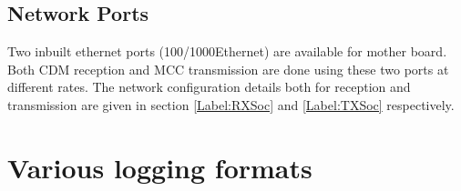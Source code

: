 \subsection{Network Ports}
Two inbuilt ethernet ports (100/1000Ethernet) are available for mother board. Both CDM reception and MCC transmission are done using these two ports at different rates. The network configuration details both for reception and transmission are given in section \ref{Label:RXSoc} and \ref{Label:TXSoc} respectively.

\section{Various logging formats}
\label{section:LogFormats}


